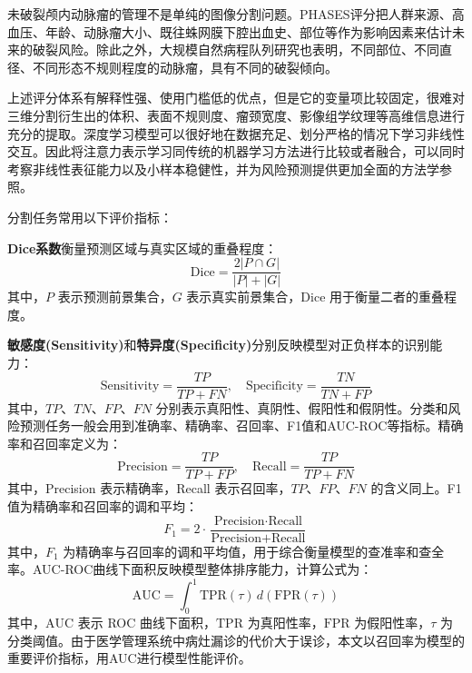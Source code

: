未破裂颅内动脉瘤的管理不是单纯的图像分割问题。PHASES评分把人群来源、高血压、年龄、动脉瘤大小、既往蛛网膜下腔出血史、部位等作为影响因素来估计未来的破裂风险\cite{greving2014}。除此之外，大规模自然病程队列研究也表明，不同部位、不同直径、不同形态不规则程度的动脉瘤，具有不同的破裂倾向\cite{morita2012}。

上述评分体系有解释性强、使用门槛低的优点，但是它的变量项比较固定，很难对三维分割衍生出的体积、表面不规则度、瘤颈宽度、影像组学纹理等高维信息进行充分的提取。深度学习模型可以很好地在数据充足、划分严格的情况下学习非线性交互。因此将注意力表示学习同传统的机器学习方法进行比较或者融合，可以同时考察非线性表征能力以及小样本稳健性，并为风险预测提供更加全面的方法学参照。


分割任务常用以下评价指标：

\textbf{Dice系数}衡量预测区域与真实区域的重叠程度：
\begin{equation}
    \text{Dice} = \frac{2|P \cap G|}{|P| + |G|}
    \label{eq:dice-basic}
\end{equation}
其中，$P$ 表示预测前景集合，$G$ 表示真实前景集合，Dice 用于衡量二者的重叠程度。

\textbf{敏感度(Sensitivity)}和\textbf{特异度(Specificity)}分别反映模型对正负样本的识别能力：
\begin{equation}
    \text{Sensitivity} = \frac{TP}{TP + FN}, \quad \text{Specificity} = \frac{TN}{TN + FP}
    \label{eq:specificity-sensitivity}
\end{equation}
其中，$TP$、$TN$、$FP$、$FN$ 分别表示真阳性、真阴性、假阳性和假阴性。分类和风险预测任务一般会用到准确率、精确率、召回率、F1值和AUC-ROC等指标。精确率和召回率定义为：
\begin{equation}
    \text{Precision} = \frac{TP}{TP + FP}, \quad \text{Recall} = \frac{TP}{TP + FN}
    \label{eq:precision-recall}
\end{equation}
其中，Precision 表示精确率，Recall 表示召回率，$TP$、$FP$、$FN$ 的含义同上。F1值为精确率和召回率的调和平均：
\begin{equation}
    F_1 = 2 \cdot \frac{\text{Precision} \cdot \text{Recall}}{\text{Precision} + \text{Recall}}
    \label{eq:f1}
\end{equation}
其中，$F_1$ 为精确率与召回率的调和平均值，用于综合衡量模型的查准率和查全率。AUC-ROC曲线下面积反映模型整体排序能力，计算公式为：
\begin{equation}
    \text{AUC} = \int_0^1 \text{TPR}(\tau) \, d(\text{FPR}(\tau))
    \label{eq:auc}
\end{equation}
其中，$\text{AUC}$ 表示 ROC 曲线下面积，$\text{TPR}$ 为真阳性率，$\text{FPR}$ 为假阳性率，$\tau$ 为分类阈值。由于医学管理系统中病灶漏诊的代价大于误诊，本文以召回率为模型的重要评价指标，用AUC进行模型性能评价。

